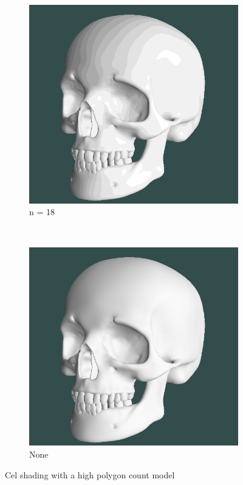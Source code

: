 \begin{figure}[h]
    \centering
    \begin{subfigure}[b]{0.15\textwidth}
        \includegraphics[width=\textwidth]{img/cel-shading-highpoly-n18.png}
        \caption{n = 18}
        \label{fig:cel-shading-high-poly-n18}
    \end{subfigure}
    ~
    \begin{subfigure}[b]{0.15\textwidth}
        \includegraphics[width=\textwidth]{img/cel-shading-highpoly-none.png}
        \caption{None}
        \label{fig:cel-shading-high-poly-none}
    \end{subfigure}
    \caption{Cel shading with a high polygon count model}
    \label{fig:cel-shading-high-poly}
\end{figure}

